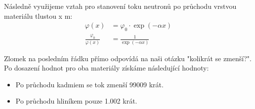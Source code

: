 Následně využijeme vztah pro stanovení toku neutronů po průchodu vrstvou materiálu tlustou x m:
\begin{align*}
    \varphi(x) &= \varphi_{0} \cdot \exp(-\alpha x)\\
    \frac{\varphi_{0}}{\varphi(x)} &=\frac{1}{\exp(-\alpha x)}
\end{align*}

Zlomek na posledním řádku přímo odpovídá na naši otázku "kolikrát se zmenší?". Po dosazení hodnot pro oba materiály získáme následující hodnoty:
\begin{itemize}
    \item Po průchodu kadmiem se tok zmenší \num{99009} krát. 
    \item Po průchodu hliníkem pouze \num{1,002} krát.
\end{itemize}



